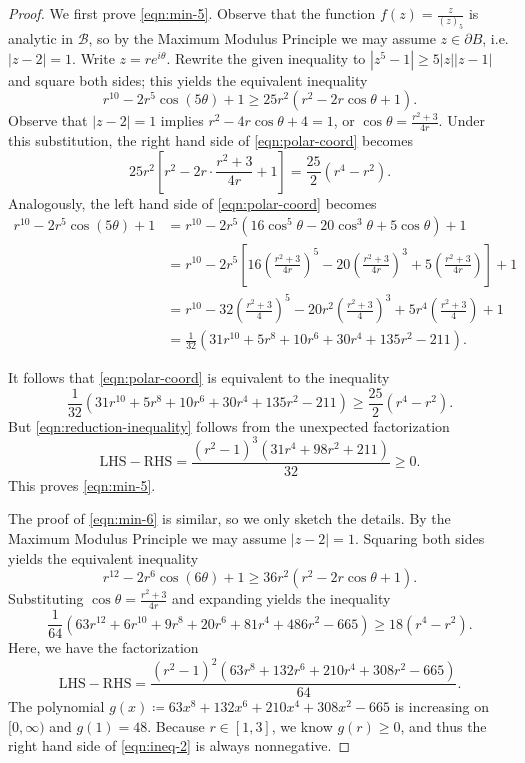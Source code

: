 \documentclass[11pt]{article}
\theoremstyle{definition}
\newcommand{\calB}{\mathcal B}
\begin{document}
\begin{proof}
	We first prove \eqref{eqn:min-5}.  Observe that the function $f(z) = \tfrac{z}{(z)_5}$ is analytic in $\calB$, so by the Maximum Modulus Principle we may assume $z\in\partial B$, i.e. $|z-2| = 1$.  Write $z = re^{i\theta}$.  Rewrite the given inequality to $|z^5 - 1| \geq 5|z| |z-1|$ and square both sides; this yields the equivalent inequality
	\begin{equation}\label{eqn:polar-coord}
		r^{10} - 2r^5\cos(5\theta) + 1 \geq 25r^2(r^2 - 2r\cos\theta + 1).
	\end{equation}
	Observe that $|z-2| = 1$ implies $r^2 - 4r\cos\theta + 4 = 1$, or $\cos\theta = \frac{r^2+3}{4r}$.  Under this substitution, the right hand side of \eqref{eqn:polar-coord} becomes
	\[
	25r^2\left[r^2 - 2r\cdot \frac{r^2+3}{4r} + 1\right] = \frac{25}2(r^4 - r^2).
	\]
	Analogously, the left hand side of \eqref{eqn:polar-coord} becomes
	\begin{align*}
		r^{10} - 2r^5\cos(5\theta) + 1 &= r^{10} - 2r^5\left(16\cos^5\theta - 20\cos^3\theta + 5\cos\theta\right) + 1\\
		&= r^{10} - 2r^5\left[16\left(\frac{r^2+3}{4r}\right)^5 - 20\left(\frac{r^2+3}{4r}\right)^3 + 5\left(\frac{r^2+3}{4r}\right)\right] + 1\\
		&= r^{10} - 32\left(\frac{r^2+3}4\right)^5 - 20r^2\left(\frac{r^2+3}{4}\right)^3 + 5r^4\left(\frac{r^2+3}4\right)+1\\
		&= \frac1{32}(31r^{10} + 5r^8 + 10r^6 + 30r^4 + 135r^2 - 211).
	\end{align*}
	
	It follows that \eqref{eqn:polar-coord} is equivalent to the inequality 
	\begin{equation}\label{eqn:reduction-inequality}
		\frac1{32}(31r^{10} + 5r^8 + 10r^6 + 30r^4 + 135r^2 - 211) \geq \frac{25}2(r^4 - r^2).
	\end{equation}
	But \eqref{eqn:reduction-inequality} follows from the unexpected factorization
	\[
	\text{LHS} - \text{RHS} = \frac{(r^2-1)^3(31r^4 + 98r^2 + 211)}{32} \geq 0.
	\]
	This proves \eqref{eqn:min-5}.
	
	The proof of \eqref{eqn:min-6} is similar, so we only sketch the details.  By the Maximum Modulus Principle we may assume $|z-2| = 1$.  Squaring both sides yields the equivalent inequality
	\begin{equation}\label{eqn:polar-coord-2}
		r^{12} - 2r^6\cos(6\theta) + 1 \geq 36r^2(r^2 - 2r\cos\theta + 1).
	\end{equation}
	Substituting $\cos \theta = \tfrac{r^2+3}{4r}$ and expanding yields the inequality
	\[
	\frac{1}{64} \left(63 r^{12}+6 r^{10}+9 r^8+20 r^6+81 r^4+486 r^2-665\right) \geq 18(r^4 - r^2).
	\] 
	Here, we have the factorization
	\begin{equation}\label{eqn:ineq-2}
		\text{LHS} - \text{RHS} =  \frac{(r^2-1)^2(63r^8+132r^6+210r^4+308r^2-665)}{64}.
	\end{equation}
	The polynomial $g(x)\coloneqq  63x^8+132x^6+210x^4+308x^2-665$ is increasing on $[0,\infty)$ and $g(1) = 48$.  Because $r\in[1,3]$, we know $g(r) \geq 0$, and thus the right hand side of \eqref{eqn:ineq-2} is always nonnegative.
\end{proof}
\end{document}
